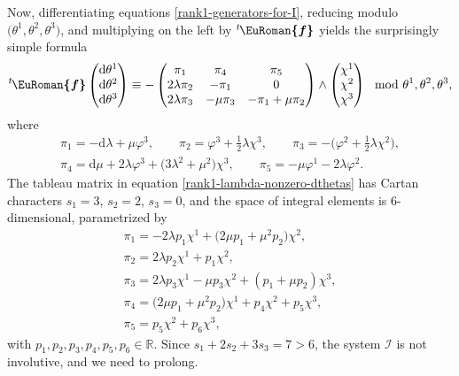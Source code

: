 \documentclass[pdftex]{sigma}
\numberwithin{equation}{section}
\newcommand{\eurom}{\EuRoman}
\renewcommand{\d}{\mathrm{d}}%
\newcommand{\cI}{{\mathcal I}}
\newcommand{\bbR}{{\mathbb R}}
\newcommand{\eurof}{\bm{\eurom{f}}}
\begin{document}
Now, differentiating equations \eqref{rank1-generators-for-I}, reducing modulo $\big(\theta^1, \theta^2, \theta^3\big)$, and multiplying on the left by ${}^t\hskip-1pt \eurof$ yields the surprisingly simple formula
\begin{gather}\label{rank1-lambda-nonzero-dthetas}
 {}^t\hskip-1pt \eurof \begin{pmatrix} \d\theta^1 \\ \d\theta^2 \\ \d\theta^3 \end{pmatrix} \equiv
-\begin{pmatrix} \pi_1 & \pi_4 & \pi_5 \\ 2\lambda \pi_2 & -\pi_1 & 0 \\ 2\lambda \pi_3 & -\mu \pi_3 & -\pi_1 + \mu \pi_2 \end{pmatrix} \wedge \begin{pmatrix} \chi^1 \\ \chi^2 \\ \chi^3 \end{pmatrix} \mod{\theta^1, \theta^2, \theta^3},
\end{gather}
where
\begin{gather*}
\pi_1 = -\d\lambda + \mu \varphi^3, \qquad
\pi_2 = \varphi^3 + \tfrac{1}{2}\lambda \chi^3, \qquad
\pi_3 = -\big(\varphi^2 + \tfrac{1}{2}\lambda \chi^2\big), \\
\pi_4 = \d\mu + 2\lambda \varphi^3 + \big(3\lambda^2 + \mu^2\big) \chi^3, \qquad
\pi_5 = -\mu \varphi^1 - 2\lambda \varphi^2.
\end{gather*}
The tableau matrix in equation \eqref{rank1-lambda-nonzero-dthetas} has Cartan characters $s_1 = 3$, $s_2 = 2$, $s_3 = 0$, and the space of integral elements is 6-dimensional, parametrized by
\begin{gather*}
\pi_1 = - 2\lambda p_1 \chi^1 + \big(2\mu p_1 + \mu^2 p_2\big) \chi^2, \\
\pi_2 = 2\lambda p_2 \chi^1 + p_1 \chi^2, \\
\pi_3 = 2\lambda p_3 \chi^1 - \mu p_3 \chi^2 + (p_1 + \mu p_2) \chi^3, \\
\pi_4 = \big(2\mu p_1 + \mu^2 p_2\big) \chi^1 + p_4 \chi^2 + p_5 \chi^3, \\
\pi_5 = p_5 \chi^2 + p_6 \chi^3,
\end{gather*}
with $p_1, p_2, p_3, p_4, p_5, p_6 \in \bbR$. Since $s_1 + 2 s_2 + 3 s_3 = 7 > 6$, the system $\cI$ is not involutive, and we need to prolong.
\end{document}
